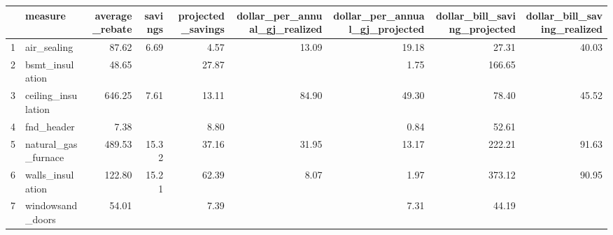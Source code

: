 \begin{table}[ht]
\centering
\begin{tabular}{rlrrrrrrr}
  \hline
 & measure & average\_rebate & savings & projected\_savings & dollar\_per\_annual\_gj\_realized & dollar\_per\_annual\_gj\_projected & dollar\_bill\_saving\_projected & dollar\_bill\_saving\_realized \\ 
  \hline
1 & air\_sealing & 87.62 & 6.69 & 4.57 & 13.09 & 19.18 & 27.31 & 40.03 \\ 
  2 & bsmt\_insulation & 48.65 &  & 27.87 &  & 1.75 & 166.65 &  \\ 
  3 & ceiling\_insulation & 646.25 & 7.61 & 13.11 & 84.90 & 49.30 & 78.40 & 45.52 \\ 
  4 & fnd\_header & 7.38 &  & 8.80 &  & 0.84 & 52.61 &  \\ 
  5 & natural\_gas\_furnace & 489.53 & 15.32 & 37.16 & 31.95 & 13.17 & 222.21 & 91.63 \\ 
  6 & walls\_insulation & 122.80 & 15.21 & 62.39 & 8.07 & 1.97 & 373.12 & 90.95 \\ 
  7 & windowsand\_doors & 54.01 &  & 7.39 &  & 7.31 & 44.19 &  \\ 
   \hline
\end{tabular}
\end{table}
